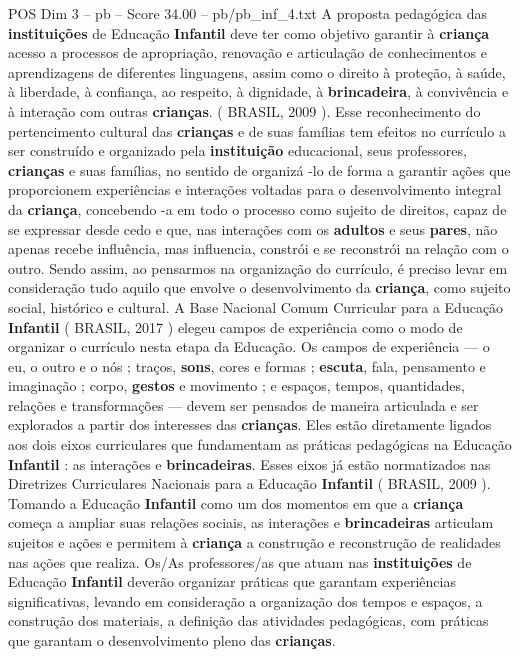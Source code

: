 \begin{textsample}{POS Dim 3 – pb – Score 34.00 – pb/pb\_inf\_4.txt}
A proposta pedagógica das \textbf{instituições} de Educação \textbf{Infantil} deve ter como objetivo garantir à \textbf{criança} acesso a processos de apropriação, renovação e articulação de conhecimentos e aprendizagens de diferentes linguagens, assim como o direito à proteção, à saúde, à liberdade, à confiança, ao respeito, à dignidade, à \textbf{brincadeira}, à convivência e à interação com outras \textbf{crianças}. ( BRASIL, 2009 ).
Esse reconhecimento do pertencimento cultural das \textbf{crianças} e de suas famílias tem efeitos no currículo a ser construído e organizado pela \textbf{instituição} educacional, seus professores, \textbf{crianças} e suas famílias, no sentido de organizá -lo de forma a garantir ações que proporcionem experiências e interações voltadas para o desenvolvimento integral da \textbf{criança}, concebendo -a em todo o processo como sujeito de direitos, capaz de se expressar desde cedo e que, nas interações com os \textbf{adultos} e seus \textbf{pares}, não apenas recebe influência, mas influencia, constrói e se reconstrói na relação com o outro.
Sendo assim, ao pensarmos na organização do currículo, é preciso levar em consideração tudo aquilo que envolve o desenvolvimento da \textbf{criança}, como sujeito social, histórico e cultural.
A Base Nacional Comum Curricular para a Educação \textbf{Infantil} ( BRASIL, 2017 ) elegeu campos de experiência como o modo de organizar o currículo nesta etapa da Educação.
Os campos de experiência — o eu, o outro e o nós ; traços, \textbf{sons}, cores e formas ; \textbf{escuta}, fala, pensamento e imaginação ; corpo, \textbf{gestos} e movimento ; e espaços, tempos, quantidades, relações e transformações — devem ser pensados de maneira articulada e ser explorados a partir dos interesses das \textbf{crianças}.
Eles estão diretamente ligados aos dois eixos curriculares que fundamentam as práticas pedagógicas na Educação \textbf{Infantil} : as interações e \textbf{brincadeiras}.
Esses eixos já estão normatizados nas Diretrizes Curriculares Nacionais para a Educação \textbf{Infantil} ( BRASIL, 2009 ).
Tomando a Educação \textbf{Infantil} como um dos momentos em que a \textbf{criança} começa a ampliar suas relações sociais, as interações e \textbf{brincadeiras} articulam sujeitos e ações e permitem à \textbf{criança} a construção e reconstrução de realidades nas ações que realiza.
Os/As professores/as que atuam nas \textbf{instituições} de Educação \textbf{Infantil} deverão organizar práticas que garantam experiências significativas, levando em consideração a organização dos tempos e espaços, a construção dos materiais, a definição das atividades pedagógicas, com práticas que garantam o desenvolvimento pleno das \textbf{crianças}.

\end{textsample}
